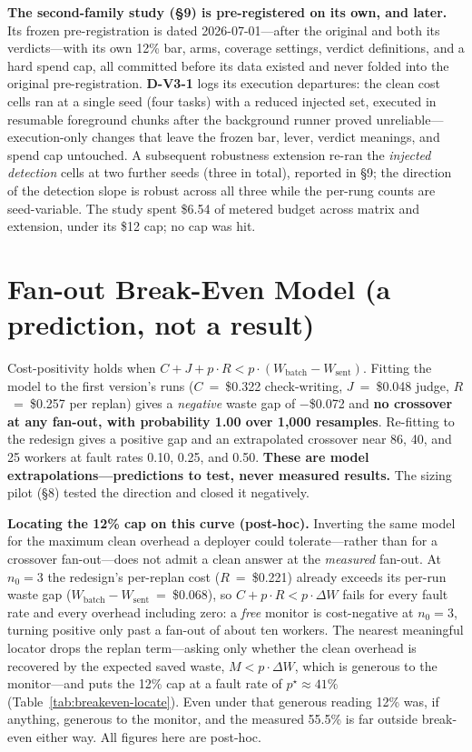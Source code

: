 \documentclass[acmsmall,screen]{acmart}
\begin{document}
\textbf{The second-family study (\S9) is pre-registered on its own, and later.}
Its frozen pre-registration is dated 2026-07-01---after the original and both its
verdicts---with its own 12\% bar, arms, coverage settings, verdict definitions,
and a hard spend cap, all committed before its data existed and never folded into
the original pre-registration. \textbf{D-V3-1} logs its execution departures: the
clean cost cells ran at a single seed (four tasks) with a reduced injected set,
executed in resumable foreground chunks after the background runner proved
unreliable---execution-only changes that leave the frozen bar, lever, verdict
meanings, and spend cap untouched. A subsequent robustness extension re-ran the
\emph{injected detection} cells at two further seeds (three in total), reported in
\S9; the direction of the detection slope is robust across all three while the
per-rung counts are seed-variable. The study spent \$6.54 of metered budget across
matrix and extension, under its \$12 cap; no cap was hit.

\section{Fan-out Break-Even Model (a prediction, not a result)}
Cost-positivity holds when
$C + J + p\cdot R < p\cdot(W_{\mathrm{batch}} - W_{\mathrm{sent}})$. Fitting the
model to the first version's runs ($C$~=~\$0.322 check-writing, $J$~=~\$0.048
judge, $R$~=~\$0.257 per replan) gives a \emph{negative} waste gap of
$-$\$0.072 and \textbf{no crossover at any fan-out, with probability 1.00 over
1,000 resamples}. Re-fitting to the redesign gives a positive gap and an
extrapolated crossover near 86, 40, and 25 workers at fault rates 0.10, 0.25,
and 0.50. \textbf{These are model extrapolations---predictions to test, never
measured results.} The sizing pilot (\S8) tested the direction and closed it
negatively.

\textbf{Locating the 12\% cap on this curve (post-hoc).} Inverting the same model
for the maximum clean overhead a deployer could tolerate---rather than for a
crossover fan-out---does not admit a clean answer at the \emph{measured} fan-out.
At $n_0=3$ the redesign's per-replan cost ($R$~=~\$0.221) already exceeds its
per-run waste gap ($W_{\mathrm{batch}}-W_{\mathrm{sent}}$~=~\$0.068), so
$C+p\cdot R<p\cdot\Delta W$ fails for every fault rate and every overhead
including zero: a \emph{free} monitor is cost-negative at $n_0=3$, turning
positive only past a fan-out of about ten workers. The nearest meaningful locator
drops the replan term---asking only whether the clean overhead is recovered by
the expected saved waste, $M<p\cdot\Delta W$, which is generous to the
monitor---and puts the 12\% cap at a fault rate of $p^\star\approx41\%$
(Table~\ref{tab:breakeven-locate}). Even under that generous reading 12\% was, if
anything, generous to the monitor, and the measured 55.5\% is far outside
break-even either way. All figures here are post-hoc.
\end{document}
